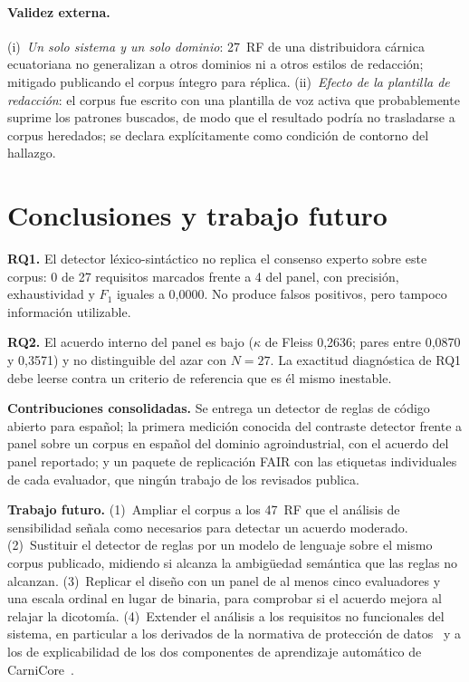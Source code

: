 \documentclass[runningheads]{llncs}
\begin{document}
\paragraph{Validez externa.}
(i)~\textit{Un solo sistema y un solo dominio}: 27~RF de una distribuidora
cárnica ecuatoriana no generalizan a otros dominios ni a otros estilos de
redacción; mitigado publicando el corpus íntegro para réplica.
(ii)~\textit{Efecto de la plantilla de redacción}: el corpus fue escrito con
una plantilla de voz activa que probablemente suprime los patrones buscados, de
modo que el resultado podría no trasladarse a corpus heredados; se declara
explícitamente como condición de contorno del hallazgo.

\section{Conclusiones y trabajo futuro}
\label{sec:conclusions}

\textbf{RQ1.} El detector léxico-sintáctico no replica el consenso experto sobre
este corpus: 0 de 27 requisitos marcados frente a 4 del panel, con precisión,
exhaustividad y $F_1$ iguales a 0,0000. No produce falsos positivos, pero
tampoco información utilizable.

\textbf{RQ2.} El acuerdo interno del panel es bajo ($\kappa$ de Fleiss 0,2636;
pares entre 0,0870 y 0,3571) y no distinguible del azar con $N = 27$. La
exactitud diagnóstica de RQ1 debe leerse contra un criterio de referencia que
es él mismo inestable.

\textbf{Contribuciones consolidadas.} Se entrega un detector de reglas de código
abierto para español; la primera medición conocida del contraste detector
frente a panel sobre un corpus en español del dominio agroindustrial, con el
acuerdo del panel reportado; y un paquete de replicación FAIR con las etiquetas
individuales de cada evaluador, que ningún trabajo de los revisados publica.

\textbf{Trabajo futuro.} (1)~Ampliar el corpus a los 47~RF que el análisis de
sensibilidad señala como necesarios para detectar un acuerdo moderado.
(2)~Sustituir el detector de reglas por un modelo de lenguaje sobre el mismo
corpus publicado, midiendo si alcanza la ambigüedad semántica que las reglas no
alcanzan. (3)~Replicar el diseño con un panel de al menos cinco evaluadores y
una escala ordinal en lugar de binaria, para comprobar si el acuerdo mejora al
relajar la dicotomía. (4)~Extender el análisis a los requisitos no funcionales
del sistema, en particular a los derivados de la normativa de protección de
datos~\cite{amaral2021gdpr} y a los de explicabilidad de los dos componentes de
aprendizaje automático de
CarniCore~\cite{chazette2020explainability,chazette2022explainable,glinz2007}.
\end{document}
